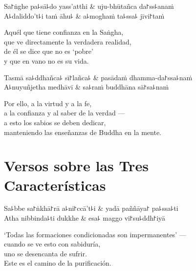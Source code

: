 \begin{twochants}
  Sa꜓ṅghe pa꜕sā꜕do yass'atthi & uju-bhūtañca da꜓ss꜕anaṁ \\
  A꜕daliddo't꜕i taṁ āhu꜕ & a꜕moghaṁ ta꜕ssa꜕ jīvi꜓taṁ \\
\end{twochants}

\begin{english}
  Aquél que tiene confianza en la Saṅgha,\\
  que ve directamente la verdadera realidad,\\
  de él se dice que no es `pobre'\\
  y que en vano no es su vida.
\end{english}

\begin{twochants}
  Tasmā sa꜕ddhañca꜕ sī꜓lañca꜕ & pasādaṁ dhamma-da꜓ssa꜕naṁ \\
  A꜕nuyuñjetha medhāvī & sa꜕raṁ buddhāna sā꜓sa꜕naṁ \\
\end{twochants}

\begin{english}
  Por ello, a la virtud y a la fe,\\
  a la confianza y al saber de la verdad ---\\
  a esto los sabios se deben dedicar,\\
  manteniendo las enseñanzas de Buddha en la mente.
\end{english}

\chapter{Versos sobre las Tres Características}


\begin{leader}
\end{leader}

\begin{twochants}
  Sa꜕bbe sa꜓ṅkhā꜓rā a꜕ni꜓ccā't꜕i & yadā paññāya꜓ pa꜕ssa꜕ti \\
  Atha nibbinda꜕ti dukkhe & esa꜕ maggo vi꜓su꜕ddh꜓iyā \\
\end{twochants}

\begin{english}
  ‘Todas las formaciones condicionadas son impermanentes’ ---\\
  cuando se ve esto con sabiduría,\\
  uno se desencanta de sufrir.\\
  Este es el camino de la purificación.
\end{english}

